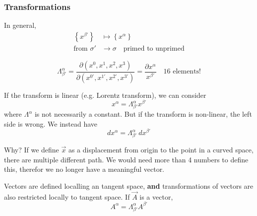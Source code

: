 \documentclass[a4paper]{article} %
\begin{document}
\subsubsection{Transformations}
In general,
\begin{align*}
\left\{x^{\beta'}\right\}&\mapsto \left\{x^{\alpha}\right\}\\
\text{from }\sigma' &\to \sigma\quad\text{primed to unprimed}
\end{align*}

\begin{equation}
\Lambda^{\alpha}_{\beta'}=\frac{\partial (x^{0},x^{1},x^{2},x^{3})}{\partial (x^{0'},x^{1'},x^{2'},x^{3'})}
=\frac{\partial x^{\alpha}}{x^{\beta'}}\quad \text{16 elements!}
\end{equation}

If the transform is linear (e.g. Lorentz transform), we can consider
\begin{equation}
x^{\alpha}=\Lambda^{\alpha}_{\beta'}x^{\beta'}
\end{equation}
where $\Lambda^{\alpha}$ is not necessarily a constant. But if the transform is non-linear, the left side is wrong. We instead have
\begin{equation}
dx^{\alpha}=\Lambda^{\alpha}_{\beta'}~dx^{\beta'}
\end{equation}

Why? If we define $\vec{x}$ as a displacement from origin to the point in a curved space, there are multiple different path. We would need more than 4 numbers to define this, therefor we no longer have a meaningful vector. 

Vectors are defined localling an tangent space, \textbf{and} transformations of vectors are also restricted locally to tangent space. If $\vec{A}$ is a vector,
\begin{equation}
A^{\alpha}=\Lambda^{\alpha}_{\beta'}A^{\beta'}
\end{equation}
\end{document}
